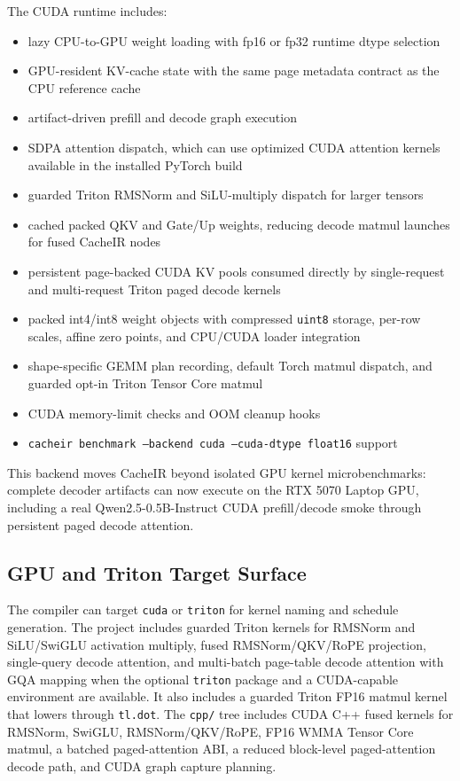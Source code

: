 \documentclass[11pt]{article}
\begin{document}
The CUDA runtime includes:

\begin{itemize}[leftmargin=*]
  \item lazy CPU-to-GPU weight loading with fp16 or fp32 runtime dtype selection
  \item GPU-resident KV-cache state with the same page metadata contract as the
        CPU reference cache
  \item artifact-driven prefill and decode graph execution
  \item SDPA attention dispatch, which can use optimized CUDA attention kernels
        available in the installed PyTorch build
  \item guarded Triton RMSNorm and SiLU-multiply dispatch for larger tensors
  \item cached packed QKV and Gate/Up weights, reducing decode matmul launches
        for fused CacheIR nodes
  \item persistent page-backed CUDA KV pools consumed directly by single-request
        and multi-request Triton paged decode kernels
  \item packed int4/int8 weight objects with compressed \texttt{uint8} storage,
        per-row scales, affine zero points, and CPU/CUDA loader integration
  \item shape-specific GEMM plan recording, default Torch matmul dispatch, and
        guarded opt-in Triton Tensor Core matmul
  \item CUDA memory-limit checks and OOM cleanup hooks
  \item \texttt{cacheir benchmark --backend cuda --cuda-dtype float16} support
\end{itemize}

This backend moves CacheIR beyond isolated GPU kernel microbenchmarks: complete
decoder artifacts can now execute on the RTX 5070 Laptop GPU, including a real
Qwen2.5-0.5B-Instruct CUDA prefill/decode smoke through persistent paged decode
attention.

\subsection{GPU and Triton Target Surface}

The compiler can target \texttt{cuda} or \texttt{triton} for kernel naming and
schedule generation. The project includes guarded Triton kernels for RMSNorm and
SiLU/SwiGLU activation multiply, fused RMSNorm/QKV/RoPE projection,
single-query decode attention, and multi-batch page-table decode attention with
GQA mapping when the optional \texttt{triton} package and a CUDA-capable
environment are available. It also includes a guarded Triton FP16 matmul kernel
that lowers through \texttt{tl.dot}. The \texttt{cpp/} tree includes CUDA C++
fused kernels for RMSNorm, SwiGLU, RMSNorm/QKV/RoPE, FP16 WMMA Tensor Core
matmul, a batched paged-attention ABI, a reduced block-level paged-attention
decode path, and CUDA graph capture planning.
\end{document}
